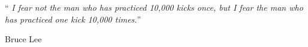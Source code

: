 \documentclass[
    12pt,
    english, %
    singlespacing, %
    oneside, %
]{MastersDoctoralThesis} %
\begin{document}
    \noindent\enquote{\itshape
    I fear not the man who has practiced 10,000 kicks once, but I fear the man who has practiced one kick 10,000 times.}\bigbreak

    \hfill Bruce Lee






    \tableofcontents %
%
%

\end{document}
